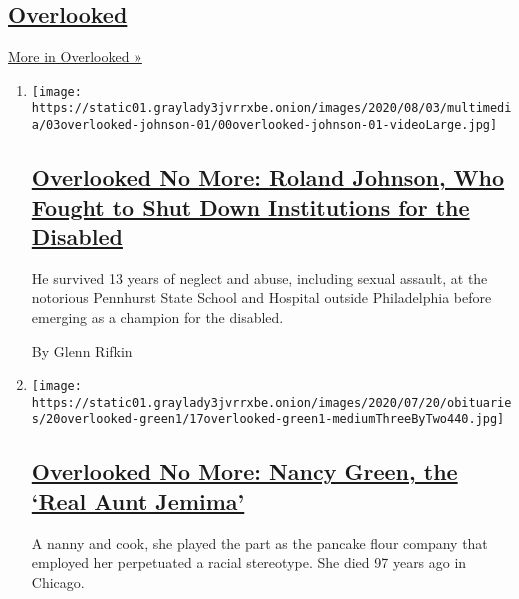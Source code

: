 \hypertarget{overlooked}{%
\subsection{\texorpdfstring{\href{/spotlight/overlooked}{Overlooked}}{Overlooked}}\label{overlooked}}

\href{/spotlight/overlooked}{More in Overlooked »}

\begin{enumerate}
\def\labelenumi{\arabic{enumi}.}
\item
  \texttt{[image: https://static01.graylady3jvrrxbe.onion/images/2020/08/03/multimedia/03overlooked-johnson-01/00overlooked-johnson-01-videoLarge.jpg]}

  \hypertarget{overlooked-no-more-roland-johnson-who-fought-to-shut-down-institutions-for-the-disabled}{%
  \subsection{\texorpdfstring{\href{/2020/07/31/obituaries/roland-johnson-overlooked.html}{Overlooked
  No More: Roland Johnson, Who Fought to Shut Down Institutions for the
  Disabled}}{Overlooked No More: Roland Johnson, Who Fought to Shut Down Institutions for the Disabled}}\label{overlooked-no-more-roland-johnson-who-fought-to-shut-down-institutions-for-the-disabled}}

  He survived 13 years of neglect and abuse, including sexual assault,
  at the notorious Pennhurst State School and Hospital outside
  Philadelphia before emerging as a champion for the disabled.

  By Glenn Rifkin
\item
  \texttt{[image: https://static01.graylady3jvrrxbe.onion/images/2020/07/20/obituaries/20overlooked-green1/17overlooked-green1-mediumThreeByTwo440.jpg]}

  \hypertarget{overlooked-no-more-nancy-green-the-real-aunt-jemima}{%
  \subsection{\texorpdfstring{\href{/2020/07/17/obituaries/nancy-green-aunt-jemima-overlooked.html}{Overlooked
  No More: Nancy Green, the `Real Aunt
  Jemima'}}{Overlooked No More: Nancy Green, the `Real Aunt Jemima'}}\label{overlooked-no-more-nancy-green-the-real-aunt-jemima}}

  A nanny and cook, she played the part as the pancake flour company
  that employed her perpetuated a racial stereotype. She died 97 years
  ago in Chicago.


\end{enumerate}
